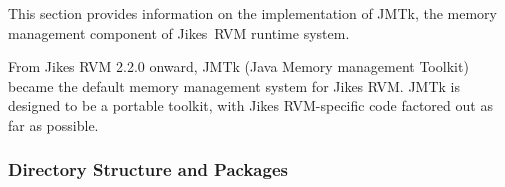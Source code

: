 
\newcommand{\JMTkJavadocURL}{{\RVMJavadocURL}/com/ibm/JikesRVM/memoryManagers/JMTk}
\newcommand{\VMInterfaceJavadocURL}{{\RVMJavadocURL}/com/ibm/JikesRVM/memoryManagers/vmInterface}
\newcommand{\vmInterfacePackageURL}{{\VMInterfaceJavadocURL}/package-frame.html}
\newcommand{\JMTkPackageURL}{{\JMTkJavadocURL}/package-frame.html}
\newcommand{\BaseFreeListURL}{{\JMTkJavadocURL}/BaseFreeList.html}
\newcommand{\MarkSweepCollectorURL}{{\JMTkJavadocURL}/MarkSweepCollector.html}
\newcommand{\BumpPointerURL}{{\JMTkJavadocURL}/BumpPointer.html}
\newcommand{\SharedQueueURL}{{\JMTkJavadocURL}/SharedQueue.html}
\newcommand{\LocalSSBURL}{{\JMTkJavadocURL}/LocalSSB.html}
\newcommand{\BasePlanURL}{{\JMTkJavadocURL}/BasePlan.html}
\newcommand{\StopTheWorldGCURL}{{\JMTkJavadocURL}/StopTheWorldGC.html}
\newcommand{\GenerationalURL}{{\JMTkJavadocURL}/Generational.html}
\newcommand{\VMResourceURL}{{\JMTkJavadocURL}/VMResource.html}
\newcommand{\CopyURL}{{\JMTkJavadocURL}/Copy.html}
\newcommand{\AddressQueueURL}{{\JMTkJavadocURL}/AddressQueue.html}
\newcommand{\MemoryResourceURL}{{\JMTkJavadocURL}/MemoryResource.html}
\newcommand{\MonotoneVMResourceURL}{{\JMTkJavadocURL}/MonotoneVMResource.html}
\newcommand{\FreeListVMResourceURL}{{\JMTkJavadocURL}/FreeListVMResource.html}
\newcommand{\LazyMmapperURL}{{\JMTkJavadocURL}/LazyMmapper.html}
\newcommand{\RawPageAllocatorURL}{{\JMTkJavadocURL}/RawPageAllocator.html}
\newcommand{\VMInterfaceURL}{{\VMInterfaceJavadocURL}/VM\_Interface.html}
\newcommand{\ScanObjectURL}{{\VMInterfaceJavadocURL}/ScanObject.html}
\newcommand{\ScanStaticsURL}{{\VMInterfaceJavadocURL}/ScanStatics.html}
\newcommand{\ScanThreadURL}{{\VMInterfaceJavadocURL}/ScanThread.html}
\newcommand{\VMGCMapIteratorURL}{{\VMInterfaceJavadocURL}/VM\_GCMapIterator.html}
\newcommand{\VMCollectorThreadURL}{{\VMInterfaceJavadocURL}/VM\_CollectorThread.html}
\newcommand{\VMHandshakeURL}{{\VMInterfaceJavadocURL}/VM\_Handshake.html}

This section provides information on the implementation of JMTk, the
memory management component of Jikes\trademark\ RVM runtime system.

From Jikes RVM 2.2.0 onward, JMTk (Java Memory management
Toolkit) became the default memory management system for Jikes RVM.
JMTk is designed to be a portable toolkit, with Jikes
RVM-specific code factored out as far as possible.

\subsubsection{Directory Structure and Packages} \label{sssec:directories}

